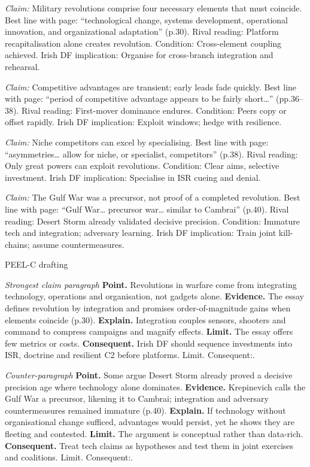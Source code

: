 \textit{Claim:} Military revolutions comprise four necessary elements that must coincide.
Best line with page: “technological change, systems development, operational innovation, and organizational adaptation” (p.30).
Rival reading: Platform recapitalisation alone creates revolution.
Condition: Cross-element coupling achieved.
Irish DF implication: Organise for cross-branch integration and rehearsal.

\textit{Claim:} Competitive advantages are transient; early leads fade quickly.
Best line with page: “period of competitive advantage appears to be fairly short…” (pp.36–38).
Rival reading: First-mover dominance endures.
Condition: Peers copy or offset rapidly.
Irish DF implication: Exploit windows; hedge with resilience.

\textit{Claim:} Niche competitors can excel by specialising.
Best line with page: “asymmetries… allow for niche, or specialist, competitors” (p.38).
Rival reading: Only great powers can exploit revolutions.
Condition: Clear aims, selective investment.
Irish DF implication: Specialise in ISR cueing and denial.

\textit{Claim:} The Gulf War was a precursor, not proof of a completed revolution.
Best line with page: “Gulf War… precursor war… similar to Cambrai” (p.40).
Rival reading: Desert Storm already validated decisive precision.
Condition: Immature tech and integration; adversary learning.
Irish DF implication: Train joint kill-chains; assume countermeasures.

PEEL-C drafting

\textit{Strongest claim paragraph}
\textbf{Point.} Revolutions in warfare come from integrating technology, operations and organisation, not gadgets alone.
\textbf{Evidence.} The essay defines revolution by integration and promises order-of-magnitude gains when elements coincide (p.30).
\textbf{Explain.} Integration couples sensors, shooters and command to compress campaigns and magnify effects.
\textbf{Limit.} The essay offers few metrics or costs.
\textbf{Consequent.} Irish DF should sequence investments into ISR, doctrine and resilient C2 before platforms. Limit. Consequent:.

\textit{Counter-paragraph}
\textbf{Point.} Some argue Desert Storm already proved a decisive precision age where technology alone dominates.
\textbf{Evidence.} Krepinevich calls the Gulf War a precursor, likening it to Cambrai; integration and adversary countermeasures remained immature (p.40).
\textbf{Explain.} If technology without organisational change sufficed, advantages would persist, yet he shows they are fleeting and contested.
\textbf{Limit.} The argument is conceptual rather than data-rich.
\textbf{Consequent.} Treat tech claims as hypotheses and test them in joint exercises and coalitions. Limit. Consequent:.

